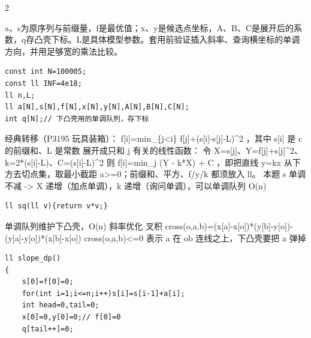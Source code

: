 \documentclass[UTF8,fontset=fandol,a4paper,twoside]{ctexart}
\newcommand{\note}[1]{{\fontsize{10}{12}\selectfont #1\par}}
\begin{document}
\begin{multicols}{2}
\note{a、s为原序列与前缀量，f是最优值；x、y是候选点坐标，A、B、C是展开后的系数，q存凸壳下标。L是具体模型参数。套用前验证插入斜率、查询横坐标的单调方向，并用足够宽的乘法比较。}
\begin{lstlisting}
const int N=100005;
const ll INF=4e18;
ll n,L;
ll a[N],s[N],f[N],x[N],y[N],A[N],B[N],C[N];
int q[N];// 下凸壳用的单调队列，存下标
\end{lstlisting}
\note{经典转移（P3195 玩具装箱）： f[\allowbreak{}i]\allowbreak{}=\allowbreak{}min\_\{j<\allowbreak{}i\} f[\allowbreak{}j]\allowbreak{}+\allowbreak{}(\allowbreak{}s[\allowbreak{}i]\allowbreak{}-\allowbreak{}s[\allowbreak{}j]\allowbreak{}-\allowbreak{}L)\allowbreak{}\textasciicircum{}2 ，其中 s[\allowbreak{}i]\allowbreak{} 是 c 的前缀和、L 是常数 展开成只和 j 有关的线性函数： 令 X=\allowbreak{}s[\allowbreak{}j]\allowbreak{}、Y=\allowbreak{}f[\allowbreak{}j]\allowbreak{}+\allowbreak{}s[\allowbreak{}j]\allowbreak{}\textasciicircum{}2、k=\allowbreak{}2*(\allowbreak{}s[\allowbreak{}i]\allowbreak{}-\allowbreak{}L)\allowbreak{}、C=\allowbreak{}(\allowbreak{}s[\allowbreak{}i]\allowbreak{}-\allowbreak{}L)\allowbreak{}\textasciicircum{}2 则 f[\allowbreak{}i]\allowbreak{}=\allowbreak{}min\_j (\allowbreak{}Y -\allowbreak{} k*X)\allowbreak{} +\allowbreak{} C ，即把直线 y=\allowbreak{}kx 从下方去切点集，取最小截距 a>\allowbreak{}=\allowbreak{}0；前缀和、平方、f/\allowbreak{}y/\allowbreak{}k 都须放入 ll。 本题 s 单调不减 -\allowbreak{}>\allowbreak{} X 递增（加点单调），k 递增（询问单调），可以单调队列 O(\allowbreak{}n)\allowbreak{}}
\begin{lstlisting}
ll sq(ll v){return v*v;}
\end{lstlisting}
\note{单调队列维护下凸壳，O(\allowbreak{}n)\allowbreak{} 斜率优化 叉积 cross(\allowbreak{}o,\allowbreak{}a,\allowbreak{}b)\allowbreak{}=\allowbreak{}(\allowbreak{}x[\allowbreak{}a]\allowbreak{}-\allowbreak{}x[\allowbreak{}o]\allowbreak{})\allowbreak{}*(\allowbreak{}y[\allowbreak{}b]\allowbreak{}-\allowbreak{}y[\allowbreak{}o]\allowbreak{})\allowbreak{}-\allowbreak{}(\allowbreak{}y[\allowbreak{}a]\allowbreak{}-\allowbreak{}y[\allowbreak{}o]\allowbreak{})\allowbreak{}*(\allowbreak{}x[\allowbreak{}b]\allowbreak{}-\allowbreak{}x[\allowbreak{}o]\allowbreak{})\allowbreak{} cross(\allowbreak{}o,\allowbreak{}a,\allowbreak{}b)\allowbreak{}<\allowbreak{}=\allowbreak{}0 表示 a 在 ob 连线之上，下凸壳要把 a 弹掉}
\begin{lstlisting}
ll slope_dp()
{
    s[0]=f[0]=0;
    for(int i=1;i<=n;i++)s[i]=s[i-1]+a[i];
    int head=0,tail=0;
    x[0]=0,y[0]=0;// f[0]=0
    q[tail++]=0;

\end{lstlisting}
\end{multicols}
\end{document}

